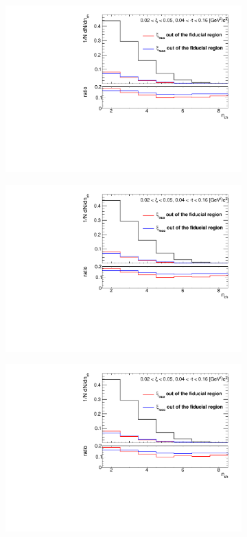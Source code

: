 \begin{figure}[h!]
	\centering
	\begin{subfigure}{.49\textwidth}
		\includegraphics[width=\textwidth,page=1]{chapters/chrgSTAR/img/xiMigration/xi.pdf}
	\end{subfigure}
	\begin{subfigure}{.49\textwidth}
		\includegraphics[width=\textwidth,page=2]{chapters/chrgSTAR/img/xiMigration/xi.pdf}
	\end{subfigure}
	\begin{subfigure}{.49\textwidth}
		\includegraphics[width=\textwidth,page=3]{chapters/chrgSTAR/img/xiMigration/xi.pdf}

\end{subfigure}
\end{figure}
